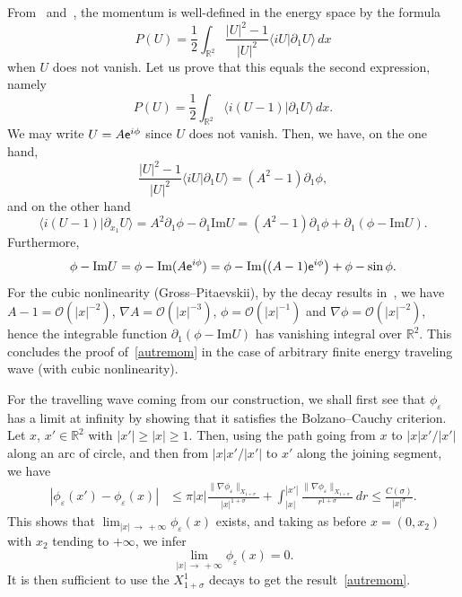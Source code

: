 \documentclass[AHL,Unicode,longabstracts,published]{cedram}
\newcommand*\p{\partial}
\newcommand*\R{\mathbb R}
\newcommand{\Imm}{\mathrm{Im}}
\newcommand*\BO{\mathcal{O}}
\newcommand*\ex{{\sf e}}
\newcommand*\ii{\infty}
\newcommand*\gs{\geqslant }
\newcommand*\ls{\leqslant }
\newcommand*\e{\varepsilon}
\newcommand*\s{\sigma}
\begin{document}
From~\cite[Definition~2.2 and (2.7)]{CM1} and~\cite{M_exist}, the momentum is well-defined in the energy space by the formula
\[
P (U) = \frac{1}{2} \int_{\R^2} \frac{ \lvert U \rvert^2 - 1 }{ \lvert U \rvert^2 } \langle i U | \p_1 U \rangle \, dx
\]
when $ U $ does not vanish. Let us prove that this equals the second expression, namely
\begin{equation}\label{autremom}
P (U) = \frac{1}{2} \int_{\R^2} \langle i (U - 1) | \p_{1} U \rangle \, dx.
\end{equation} We may write $ U = A \ex^{i \phi } $ since $U $ does not vanish. Then, we have, on the one hand,
\[
\frac{ \lvert U \rvert^2 - 1 }{ \lvert U \rvert^2 } \langle i U | \p_1 U \rangle = \left(A^2 - 1\right) \p_1 \phi,
\]
and on the other hand
\[
\langle i (U - 1) | \p_{x_1} U \rangle = A^2 \p_1 \phi - \p_1 {\Imm} U = \left(A^2 - 1\right) \p_1 \phi + \p_1 (\phi - {\Imm} U).
\]
Furthermore,
\[
\phi - {\Imm} U = \phi - {\Imm} (A \ex^{i \phi}) = \phi - {\Imm} \big((A-1) \ex^{i \phi} \big) + \phi - \sin \phi.
\]
For the cubic nonlinearity (Gross--Pitaevskii), by the decay results in~\cite[Theorem~11]{Gra_decay}, we have $ A-1 = \BO (|x|^{-2}) $, $ \nabla A = \BO (|x|^{-3}) $, $ \phi = \BO (|x|^{-1}) $ and $ \nabla \phi = \BO (|x|^{-2}) $, hence the integrable function $ \p_1 (\phi - {\Imm} U) $ has vanishing integral over $\R^2 $. This concludes the proof of~\eqref{autremom} in the case of arbitrary finite energy traveling wave (with cubic nonlinearity).

For the travelling wave coming from our construction, we shall first see that $ \phi_\e $ has a limit at infinity by showing that it satisfies the Bolzano--Cauchy criterion. Let $ x $, $x' \in \R^2 $ with $ |x'| \gs |x| \gs 1 $. Then, using the path going from $x$ to $ |x| x'/|x'| $ along an arc of circle, and then from $ |x| x'/|x'| $ to $x'$ along the joining segment, we have
\begin{align*}
\left\lvert \phi_\e (x') - \phi_\e (x) \right\rvert & \ls \pi |x| \frac{\| \nabla \phi_\e \|_{X_{1+\s}}}{ |x|^{1+\s} } + \int_{|x|}^{|x'|} \frac{ \| \nabla \phi_\e \|_{X_{1+\s} } }{ r^{1+\s} } \, dr
\ls \frac{C(\s)}{|x|^{\s} }.
\end{align*}
This shows that $ \lim_{|x|\,\to\,+\ii} \phi_\e (x) $ exists, and taking as before $ x = (0, x_2) $ with $ x_2 $ tending to $+\ii $, we infer
\[
\lim_{|x|\,\to\,+\ii } \phi_\e (x) = 0.
\]
It is then sufficient to use the $ X^1_{1+\s} $ decays to get the result~\eqref{autremom}.
\end{document}
